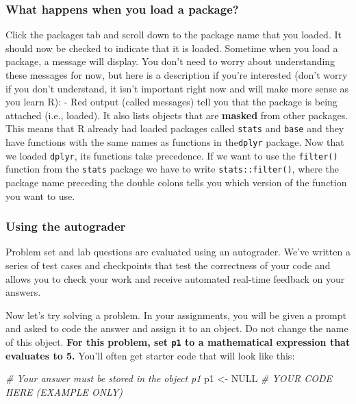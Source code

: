 \documentclass[
]{article}
\newenvironment{Shaded}{\begin{snugshade}}{\end{snugshade}}
\newcommand{\CommentTok}[1]{\textcolor[rgb]{0.56,0.35,0.01}{\textit{#1}}}
\newcommand{\ConstantTok}[1]{\textcolor[rgb]{0.56,0.35,0.01}{#1}}
\newcommand{\NormalTok}[1]{#1}
\newcommand{\OtherTok}[1]{\textcolor[rgb]{0.56,0.35,0.01}{#1}}
\begin{document}
\subsubsection{What happens when you load a
package?}\label{what-happens-when-you-load-a-package}

Click the packages tab and scroll down to the package name that you
loaded. It should now be checked to indicate that it is loaded. Sometime
when you load a package, a message will display. You don't need to worry
about understanding these messages for now, but here is a description if
you're interested (don't worry if you don't understand, it isn't
important right now and will make more sense as you learn R): - Red
output (called messages) tell you that the package is being attached
(i.e., loaded). It also lists objects that are \textbf{masked} from
other packages. This means that R already had loaded packages called
\texttt{stats} and \texttt{base} and they have functions with the same
names as functions in the\texttt{dplyr} package. Now that we loaded
\texttt{dplyr}, its functions take precedence. If we want to use the
\texttt{filter()} function from the \texttt{stats} package we have to
write \texttt{stats::filter()}, where the package name preceding the
double colons tells you which version of the function you want to use.

\subsubsection{Using the autograder}\label{using-the-autograder}

Problem set and lab questions are evaluated using an autograder. We've
written a series of test cases and checkpoints that test the correctness
of your code and allows you to check your work and receive automated
real-time feedback on your answers.

Now let's try solving a problem. In your assignments, you will be given
a prompt and asked to code the answer and assign it to an object. Do not
change the name of this object. \textbf{For this problem, set
\texttt{p1} to a mathematical expression that evaluates to 5.} You'll
often get starter code that will look like this:

\begin{Shaded}
\begin{Highlighting}[]
\CommentTok{\# Your answer must be stored in the object p1}
\NormalTok{p1 }\OtherTok{\textless{}{-}} \ConstantTok{NULL} \CommentTok{\# YOUR CODE HERE (EXAMPLE ONLY)}
\end{Highlighting}
\end{Shaded}
\end{document}
